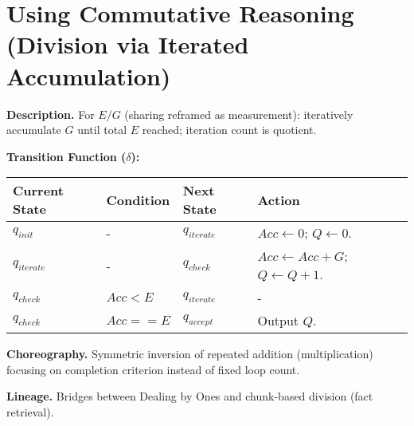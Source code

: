 \documentclass[
]{article}
\begin{document}
\section{Using Commutative Reasoning (Division via Iterated
Accumulation)}\label{using-commutative-reasoning-division-via-iterated-accumulation}

\textbf{Description.} For \(E / G\) (sharing reframed as measurement):
iteratively accumulate \(G\) until total \(E\) reached; iteration count
is quotient.

\textbf{Transition Function (\(\delta\)):}

\begin{longtable}[]{@{}
  >{\raggedright\arraybackslash}p{}
  >{\raggedright\arraybackslash}p{}
  >{\raggedright\arraybackslash}p{}
  >{\raggedright\arraybackslash}p{}@{}}
\toprule\noalign{}
\begin{minipage}[b]{\linewidth}\raggedright
Current State
\end{minipage} & \begin{minipage}[b]{\linewidth}\raggedright
Condition
\end{minipage} & \begin{minipage}[b]{\linewidth}\raggedright
Next State
\end{minipage} & \begin{minipage}[b]{\linewidth}\raggedright
Action
\end{minipage} \\
\midrule\noalign{}
\endhead
\bottomrule\noalign{}
\endlastfoot
\(q_{init}\) & - & \(q_{iterate}\) & \(Acc \leftarrow 0\);
\(Q \leftarrow 0\). \\
\(q_{iterate}\) & - & \(q_{check}\) & \(Acc \leftarrow Acc + G\);
\(Q \leftarrow Q + 1\). \\
\(q_{check}\) & \(Acc < E\) & \(q_{iterate}\) & - \\
\(q_{check}\) & \(Acc == E\) & \(q_{accept}\) & Output \(Q\). \\
\end{longtable}

\textbf{Choreography.} Symmetric inversion of repeated addition
(multiplication) focusing on completion criterion instead of fixed loop
count.

\textbf{Lineage.} Bridges between Dealing by Ones and chunk-based
division (fact retrieval).
\end{document}

